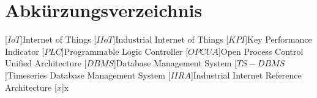 \clearpage
\chapter*{Abkürzungsverzeichnis}\label{abkuerzungsverzeichnis}
\begin{acronym}[YTM]
\setlength{\itemsep}{-\parsep}

[$IoT$]{\hspace{1cm}Internet of Things}
[$IIoT$]{\hspace{1cm}Industrial Internet of Things}
[$KPI$]{\hspace{1cm}Key Performance Indicator}
[$PLC$]{\hspace{1cm}Programmable Logic Controller}
[$OPC UA$]{\hspace{1cm}Open Process Control Unified Architecture}
[$DBMS$]{\hspace{1cm}Database Management System}
[$TS-DBMS$]{\hspace{1cm}Timeseries Database Management System}
[$IIRA$]{\hspace{1cm}Industrial Internet Reference Architecture}
\acro{}[$x$]{\hspace{1cm}x}

\end{acronym}
